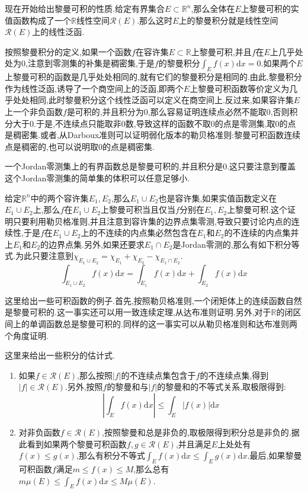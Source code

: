 现在开始给出黎曼可积的性质.给定有界集合$E\subset\mathbb{R}^n$,那么全体在$E$上黎曼可积的实值函数构成了一个$\mathbb{R}$线性空间$\mathscr{R}(E)$.那么这时$E$上的黎曼积分就是线性空间$\mathscr{R}(E)$上的线性泛函.

按照黎曼积分的定义,如果一个函数$f$在容许集$E\subset\mathbb{R}$上黎曼可积,并且$f$在$E$上几乎处处为0,注意到零测集的补集是稠密集,于是$f$的黎曼积分$\int_Ef(x)\mathrm{d}x=0$.如果两个$E$上黎曼可积的函数是几乎处处相同的,就有它们的黎曼积分是相同的.由此,黎曼积分作为线性泛函,诱导了一个商空间上的泛函,即两个$E$上黎曼可积函数等价定义为几乎处处相同,此时黎曼积分这个线性泛函可以定义在商空间上.反过来,如果容许集$E$上一个非负函数$f$是可积的,并且积分为0,那么容易证明连续点必然不能取0,否则积分大于0.于是,不连续点只能取非0数,导致这样的函数不取0的点是零测集,取0的点是稠密集.或者,从Darboux准则可以证明弱化版本的勒贝格准则:黎曼可积函数连续点是稠密的,也可以说明取0的点是稠密集.

一个Jordan零测集上的有界函数总是黎曼可积的,并且积分是0.这只要注意到覆盖这个Jordan零测集的简单集的体积可以任意足够小.

给定$\mathbb{R}^n$中的两个容许集$E_1,E_2$,那么$E_1\cup E_2$也是容许集,如果实值函数定义在$E_1\cup E_2$上,那么$f$在$E_1\cup E_2$上黎曼可积当且仅当$f$分别在$E_1,E_2$上黎曼可积.这个证明只要利用勒贝格准则,并且注意到容许集的边界点集零测,导致只要讨论内点的连续性,于是$f$在$E_1\cup E_2$上的不连续的内点集必然包含在$E_1$和$E_2$的不连续的内点集并上$E_1$和$E_2$的边界点集.另外,如果还要求$E_1\cap E_2$是Jordan零测的,那么有如下积分等式.为此只要注意到$\chi_{E_1\cup E_2}=\chi_{E_1}+\chi_{E_2}-\chi_{E_1\cap E_2}$.
$$\int_{E_1\cup E_2}f(x)\mathrm{d}x=\int_{E_1}f(x)\mathrm{d}x+\int_{E_2}f(x)\mathrm{d}x$$

这里给出一些可积函数的例子.首先,按照勒贝格准则,一个闭矩体上的连续函数自然是黎曼可积的.这一事实还可以用一致连续定理,从达布准则证明.另外,对于$\mathbb{R}$的闭区间上的单调函数总是黎曼可积的.同样的这一事实可以从勒贝格准则和达布准则两个角度证明.

这里来给出一些积分的估计式.
\begin{enumerate}
	\item 如果$f\in\mathscr{R}(E)$,那么按照$|f|$的不连续点集包含于$f$的不连续点集,得到$|f|\in\mathscr{R}(E)$.另外,按照$f$的黎曼和与$|f|$的黎曼和的不等式关系,取极限得到:
	$$\left|\int_Ef(x)\mathrm{d}x\right|\le\int_E|f(x)|\mathrm{d}x$$
	\item 对非负函数$f\in\mathscr{R}(E)$,按照黎曼和总是非负的,取极限得到积分总是非负的.据此看到如果两个黎曼可积函数$f,g\in\mathscr{R}(E)$,并且满足$E$上处处有$f(x)\le g(x)$,那么有积分不等式$\int_Ef(x)\mathrm{d}x\le\int_Eg(x)\mathrm{d}x$.最后,如果黎曼可积函数$f$满足$m\le f(x)\le M$,那么总有$m \mu(E)\le\int_Ef(x)\mathrm{d}x\le M\mu(E)$.
\end{enumerate}


